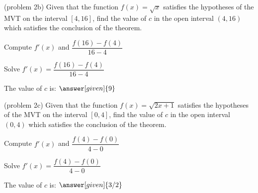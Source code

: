 \documentclass{ximera}
\begin{document}
\begin{problem}(problem 2b)
  Given that the function $f(x) = \sqrt x$ satisfies the hypotheses of the MVT on the
	interval $[4,16]$, find the value of $c$ in the open interval $(4,16)$ which satisfies 
	the conclusion of the theorem.
	
    \begin{hint}
      Compute $f'(x)$ and $\dfrac{f(16) - f(4)}{16-4}$
    \end{hint}
		\begin{hint}
		  Solve $f'(x) = \dfrac{f(16) - f(4)}{16-4}$
		\end{hint}
		
		The value of $c$ is:
		 $\answer[given]{9}$
\end{problem}


\begin{problem}(problem 2c)
  Given that the function $f(x) = \sqrt{2x+1}$ satisfies the hypotheses of the MVT on the
	interval $[0,4]$, find the value of $c$ in the open interval $(0,4)$ which satisfies 
	the conclusion of the theorem.
	
    \begin{hint}
      Compute $f'(x)$ and $\dfrac{f(4) - f(0)}{4-0}$
    \end{hint}
		\begin{hint}
		  Solve $f'(x) = \dfrac{f(4) - f(0)}{4-0}$
		\end{hint}
		
		The value of $c$ is:
		 $\answer[given]{3/2}$
\end{problem}
\end{document}
